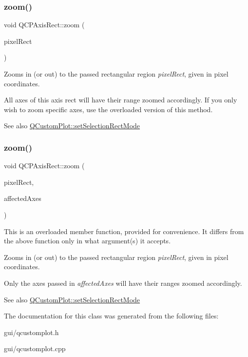 \subsubsection{\texorpdfstring{zoom()}{zoom()}\hspace{0.1cm}{\footnotesize\ttfamily [1/2]}}
{\footnotesize\ttfamily void Q\+C\+P\+Axis\+Rect\+::zoom (\begin{DoxyParamCaption}\item[{const Q\+RectF \&}]{pixel\+Rect }\end{DoxyParamCaption})}

Zooms in (or out) to the passed rectangular region {\itshape pixel\+Rect}, given in pixel coordinates.

All axes of this axis rect will have their range zoomed accordingly. If you only wish to zoom specific axes, use the overloaded version of this method.

\begin{DoxySeeAlso}{See also}
\hyperlink{classQCustomPlot_a810ef958ebe84db661c7288b526c0deb}{Q\+Custom\+Plot\+::set\+Selection\+Rect\+Mode} 
\end{DoxySeeAlso}
\mbox{\label{classQCPAxisRect_a6a39fb3aea60a8c503bdcb3f0477d2f6}} 
\subsubsection{\texorpdfstring{zoom()}{zoom()}\hspace{0.1cm}{\footnotesize\ttfamily [2/2]}}
{\footnotesize\ttfamily void Q\+C\+P\+Axis\+Rect\+::zoom (\begin{DoxyParamCaption}\item[{const Q\+RectF \&}]{pixel\+Rect,  }\item[{const Q\+List$<$ \hyperlink{classQCPAxis}{Q\+C\+P\+Axis} $\ast$$>$ \&}]{affected\+Axes }\end{DoxyParamCaption})}

This is an overloaded member function, provided for convenience. It differs from the above function only in what argument(s) it accepts.

Zooms in (or out) to the passed rectangular region {\itshape pixel\+Rect}, given in pixel coordinates.

Only the axes passed in {\itshape affected\+Axes} will have their ranges zoomed accordingly.

\begin{DoxySeeAlso}{See also}
\hyperlink{classQCustomPlot_a810ef958ebe84db661c7288b526c0deb}{Q\+Custom\+Plot\+::set\+Selection\+Rect\+Mode} 
\end{DoxySeeAlso}


The documentation for this class was generated from the following files\+:\begin{DoxyCompactItemize}
\item 
gui/qcustomplot.\+h\item 
gui/qcustomplot.\+cpp\end{DoxyCompactItemize}
